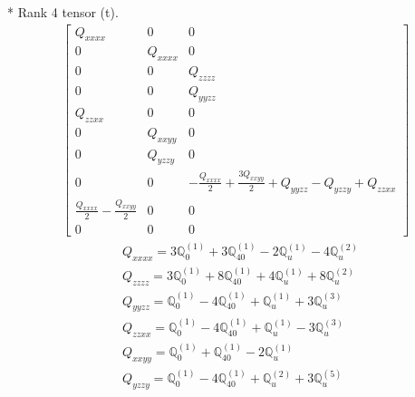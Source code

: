 \documentclass[fleqn,8pt,landscape]{jsarticle}
\begin{document}
* Rank 4 tensor (t).
\begin{align*}
\begin{bmatrix} Q_{xxxx} & 0 & 0 \\ 0 & Q_{xxxx} & 0 \\ 0 & 0 & Q_{zzzz} \\ 0 & 0 & Q_{yyzz} \\ Q_{zzxx} & 0 & 0 \\ 0 & Q_{xxyy} & 0 \\ 0 & Q_{yzzy} & 0 \\ 0 & 0 & - \frac{Q_{xxxx}}{2} + \frac{3 Q_{xxyy}}{2} + Q_{yyzz} - Q_{yzzy} + Q_{zzxx} \\ \frac{Q_{xxxx}}{2} - \frac{Q_{xxyy}}{2} & 0 & 0 \\ 0 & 0 & 0 \end{bmatrix}
\end{align*}
\begin{align*}
& Q_{xxxx} = 3 \mathbb{Q}_{0}^{(1)} + 3 \mathbb{Q}_{40}^{(1)} - 2 \mathbb{Q}_{u}^{(1)} - 4 \mathbb{Q}_{u}^{(2)} \\
& Q_{zzzz} = 3 \mathbb{Q}_{0}^{(1)} + 8 \mathbb{Q}_{40}^{(1)} + 4 \mathbb{Q}_{u}^{(1)} + 8 \mathbb{Q}_{u}^{(2)} \\
& Q_{yyzz} = \mathbb{Q}_{0}^{(1)} - 4 \mathbb{Q}_{40}^{(1)} + \mathbb{Q}_{u}^{(1)} + 3 \mathbb{Q}_{u}^{(3)} \\
& Q_{zzxx} = \mathbb{Q}_{0}^{(1)} - 4 \mathbb{Q}_{40}^{(1)} + \mathbb{Q}_{u}^{(1)} - 3 \mathbb{Q}_{u}^{(3)} \\
& Q_{xxyy} = \mathbb{Q}_{0}^{(1)} + \mathbb{Q}_{40}^{(1)} - 2 \mathbb{Q}_{u}^{(1)} \\
& Q_{yzzy} = \mathbb{Q}_{0}^{(1)} - 4 \mathbb{Q}_{40}^{(1)} + \mathbb{Q}_{u}^{(2)} + 3 \mathbb{Q}_{u}^{(5)}
\end{align*}
\end{document}
